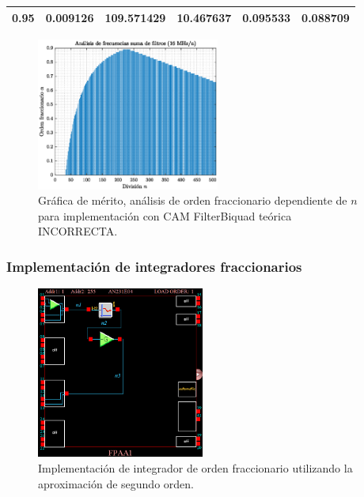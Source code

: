 \documentclass[10pt]{beamer}
\begin{document}
\begin{frame}
\begin{minipage}[b]{0.45\textwidth}
\begin{tiny}
\begin{table}[!hbp]
\begin{tabular}{cccccc}
			0.95 & 0.009126 & 109.571429 & 10.467637 & 0.095533 & 0.088709 \\
			\hline                                              
			\end{tabular}                                                                
	\end{table}
			\end{tiny}
		\end{minipage} \hfill \begin{minipage}[b]{0.45\textwidth}
			\begin{figure}[hbtp]
		\caption{Gráfica de mérito, análisis de orden fraccionario dependiente de $n$ para implementación con CAM FilterBiquad teórica INCORRECTA.} 
		\label{fig:W4_analisis_frecuencias_biquad}
		\centering
		\includegraphics[width=6cm]{../imagenes/W4_analisis_frecuencias_biquad.eps}
	\end{figure}
		\end{minipage}
	\end{frame}
	\begin{frame}
		\frametitle{Implementación de integradores fraccionarios}
		\begin{figure}[!ht] 
		\caption{Implementación de integrador de orden fraccionario utilizando la aproximación de segundo orden.}
		\label{fig:W3_AD2_biquad}
		\centering
		\includegraphics[width = 5.5cm]{../imagenes/W3_AD2_biquad}
	\end{figure}
	\end{frame}
\end{document}
